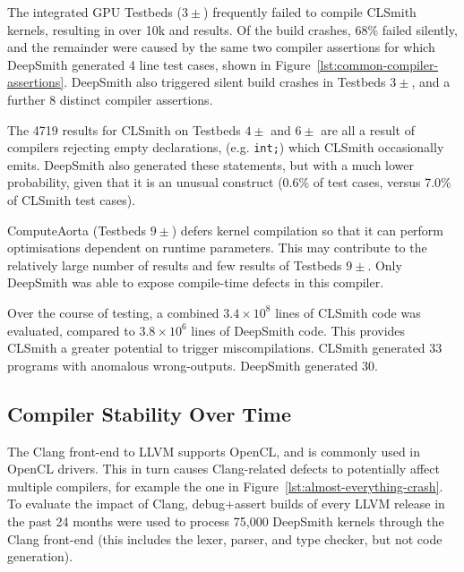 

The integrated GPU Testbeds ($3\pm$) frequently failed to compile CLSmith kernels, resulting in over 10k \bc and \bto results. Of the build crashes, 68\% failed silently, and the remainder were caused by the same two compiler assertions for which DeepSmith generated 4 line test cases, shown in Figure~\ref{lst:common-compiler-assertions}. DeepSmith also triggered silent build crashes in Testbeds $3\pm$, and a further 8 distinct compiler assertions.

The 4719 \abf results for CLSmith on Testbeds $4\pm$ and $6\pm$ are all a result of compilers rejecting empty declarations, (e.g. \texttt{int;}) which CLSmith occasionally emits. DeepSmith also generated these statements, but with a much lower probability, given that it is an unusual construct (0.6\% of test cases, versus 7.0\% of CLSmith test cases).

ComputeAorta (Testbeds $9\pm$) defers kernel compilation so that it can perform optimisations dependent on runtime parameters. This may contribute to the relatively large number of \arc results and few \bc results of Testbeds $9\pm$. Only DeepSmith was able to expose compile-time defects in this compiler.

Over the course of testing, a combined $3.4 \times 10^8$ lines of CLSmith code was evaluated, compared to $3.8 \times 10^6$ lines of DeepSmith code. This provides CLSmith a greater potential to trigger miscompilations. CLSmith generated 33 programs with anomalous wrong-outputs. DeepSmith generated 30.


\subsection{Compiler Stability Over Time}%
\label{subsec:clangs}

The Clang front-end to LLVM supports OpenCL, and is commonly used in OpenCL drivers. This in turn causes Clang-related defects to potentially affect multiple compilers, for example the one in Figure~\ref{lst:almost-everything-crash}. To evaluate the impact of Clang, debug+assert builds of every LLVM release in the past 24 months were used to process 75,000 DeepSmith kernels through the Clang front-end (this includes the lexer, parser, and type checker, but not code generation).


